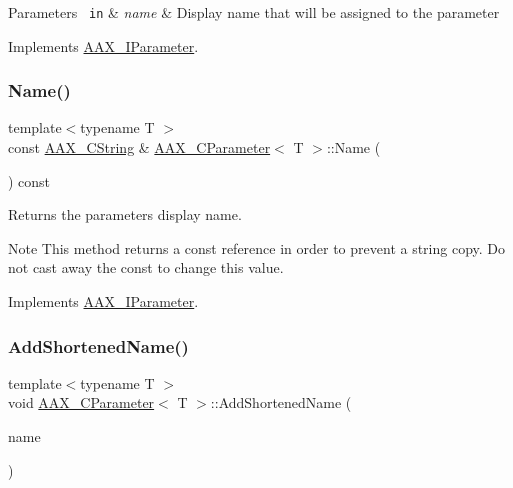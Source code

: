 \begin{DoxyParams}[1]{Parameters}
\mbox{\texttt{ in}}  & {\em name} & Display name that will be assigned to the parameter \\
\hline
\end{DoxyParams}


Implements \mbox{\hyperlink{a01857_a480e9947cdaee6f26ca2bbaeb9de56b2}{A\+A\+X\+\_\+\+I\+Parameter}}.

\mbox{\label{a01537_a0ca723751549cff4168198f8480b28e9}} 
\subsubsection{\texorpdfstring{Name()}{Name()}}
{\footnotesize\ttfamily template$<$typename T $>$ \\
const \mbox{\hyperlink{a01573}{A\+A\+X\+\_\+\+C\+String}} \& \mbox{\hyperlink{a01537}{A\+A\+X\+\_\+\+C\+Parameter}}$<$ T $>$\+::Name (\begin{DoxyParamCaption}{ }\end{DoxyParamCaption}) const\hspace{0.3cm}{\ttfamily [virtual]}}



Returns the parameter\textquotesingle{}s display name. 

\begin{DoxyNote}{Note}
This method returns a const reference in order to prevent a string copy. Do not cast away the const to change this value. 
\end{DoxyNote}


Implements \mbox{\hyperlink{a01857_ae1dae8844a16492726cb6caac7e2e822}{A\+A\+X\+\_\+\+I\+Parameter}}.

\mbox{\label{a01537_aa4f22a15a2e73048b602e7f81db37cb4}} 
\subsubsection{\texorpdfstring{AddShortenedName()}{AddShortenedName()}}
{\footnotesize\ttfamily template$<$typename T $>$ \\
void \mbox{\hyperlink{a01537}{A\+A\+X\+\_\+\+C\+Parameter}}$<$ T $>$\+::Add\+Shortened\+Name (\begin{DoxyParamCaption}\item[{const \mbox{\hyperlink{a01573}{A\+A\+X\+\_\+\+C\+String}} \&}]{name }\end{DoxyParamCaption})\hspace{0.3cm}{\ttfamily [virtual]}}



